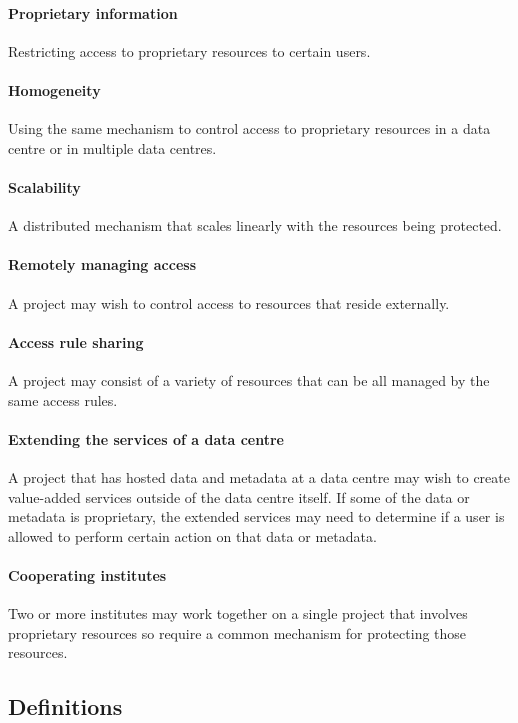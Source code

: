 \documentclass[11pt,a4paper]{ivoa}
\begin{document}
\paragraph{Proprietary information} Restricting access to proprietary resources to certain users.

\paragraph{Homogeneity} Using the same mechanism to control access to proprietary resources in a data centre or in multiple data centres.

\paragraph{Scalability} A distributed mechanism that scales linearly with the resources being protected.

\paragraph{Remotely managing access} A project may wish to control access to resources that reside externally.

\paragraph{Access rule sharing} A project may consist of a variety of resources that can be all managed by the same access rules.

\paragraph{Extending the services of a data centre} A project that has hosted data and metadata at a data centre may wish to create value-added services outside of the data centre itself.  If some of the data or metadata is proprietary, the extended services may need to determine if a user is allowed to perform certain action on that data or metadata.

\paragraph{Cooperating institutes} Two or more institutes may work together on a single project that involves proprietary resources so require a common mechanism for protecting those resources.

\subsection{Definitions}
\end{document}
